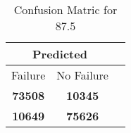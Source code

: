 \begin{table}[] 
\label{Table: Prediction Accuracy-DMD87.5OnlySunEKF-ignoreReflection-Reflection} 
\caption{Confusion Matric for 87.5} 
\centering 
\begin{tabular} 
 {@{}ccc@{}} 
\toprule 
\multicolumn{2}{c}{\textbf{Predicted}}
 \\ \midrule 
\multicolumn{1}{|c|}{Failure} & 
\multicolumn{1}{c|}{No Failure}
 \\ \midrule 
\multicolumn{1}{|c|}{\color{green}\textbf{73508}} & 
\multicolumn{1}{c|}{\color{red}\textbf{10345}}
 \\ \midrule 
\multicolumn{1}{|c|}{\color{red}\textbf{10649}} & 
\multicolumn{1}{c|}{\color{green}\textbf{75626}}
 \\ \bottomrule 
\end{tabular} 
\end{table} 
